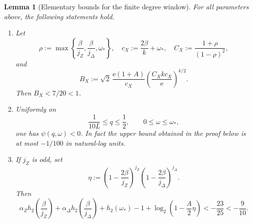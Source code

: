\documentclass[10pt,a4paper]{amsart}
\newtheorem{lemma}{Lemma}
\newcommand{\h}{h_2}
\begin{document}
\begin{lemma}[Elementary bounds for the finite degree window]\label{lem:mn-window-bounds-jp}
For all parameters above, the following statements hold.

\begin{enumerate}
\item Let
\[
\rho:=\max\!\left\{\frac\beta{j_Z},\frac\beta{j_\Delta},\omega_*\right\},
\quad c_X:=\frac{2\beta}{k}+\omega_*,
\quad C_X:=\frac{1+\rho}{(1-\rho)^2},
\]
and
\[
B_X:=\sqrt2\,\frac{\mathrm e(1+A)}{c_X}
\left(\frac{C_Xkc_X}{\mathrm e}\right)^{k/2}.
\]
Then \(B_X<7/20<1\).

\item Uniformly on
\[
\frac1{10L}\le q\le\frac12,\qquad 0\le\omega\le\omega_*,
\]
one has \(\psi(q,\omega)<0\).  In fact the upper bound obtained in the
proof below is at most \(-1/100\) in natural-log units.

\item If \(j_Z\) is odd, set
\[
\eta:=
\left(1-\frac{2\beta}{j_Z}\right)^{j_Z}
\left(1-\frac{2\beta}{j_\Delta}\right)^{j_\Delta}.
\]
Then
\[
\alpha_Z\h\!\left(\frac\beta{j_Z}\right)
+\alpha_\Delta\h\!\left(\frac\beta{j_\Delta}\right)
+\h(\omega_*)-1+\log_2\!\left(1-\frac A2\eta\right)<-\frac{23}{25}< -\frac9{10}.
\]
\end{enumerate}
\end{lemma}
\end{document}

